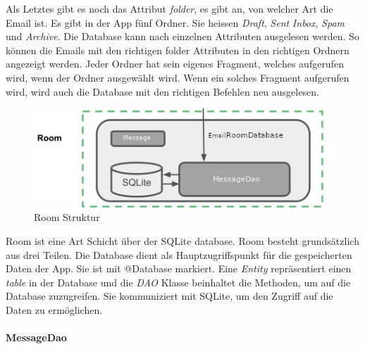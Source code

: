 \documentclass[a4paper,11pt]{article}
\begin{document}
Als Letztes gibt es noch das Attribut \textit{folder}, es gibt an, von welcher Art die Email ist. Es gibt in der App fünf Ordner. Sie heissen \textit{Draft}, \textit{Sent} 
\textit{Inbox}, \textit{Spam} und \textit{Archive}. Die Database kann nach einzelnen Attributen ausgelesen werden. So können die Emails mit den richtigen
folder Attributen in den richtigen Ordnern angezeigt werden. Jeder Ordner hat sein eigenes Fragment, welches aufgerufen wird, wenn der Ordner ausgewählt wird.
Wenn ein solches Fragment aufgerufen wird, wird auch die Database mit den richtigen Befehlen neu ausgelesen.  \\





\begingroup
\setlength{\intextsep}{10pt}
\setlength{\columnsep}{15pt}

\begin{figure}
    \centering
    \includegraphics[width=.4\textwidth]{media/RoomStructure.png}
    \caption{Room Struktur \cite{appStructurePicture}}
\end{figure}


Room ist eine Art Schicht über der SQLite database. 
Room besteht grundsätzlich aus drei Teilen. Die Database dient als Hauptzugriffspunkt für die gespeicherten Daten der App. Sie ist mit @Database markiert. 
Eine \textit{Entity} repräsentiert einen \textit{table} in der Database und die \textit{DAO} Klasse beinhaltet die Methoden, um auf die Database zuzugreifen. Sie kommuniziert
mit SQLite, um den Zugriff auf die Daten zu ermöglichen. \cite{roomStructure}


\paragraph{MessageDao}
\end{document}
